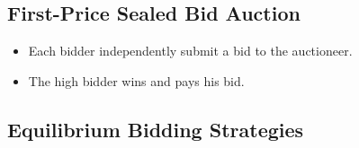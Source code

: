 \documentclass[]{book}
\providecommand{\tightlist}{%
  \setlength{\itemsep}{0pt}\setlength{\parskip}{0pt}}
\begin{document}
\subsection{First-Price Sealed Bid
Auction}\label{first-price-sealed-bid-auction}

\begin{itemize}
\tightlist
\item
  Each bidder independently submit a bid to the auctioneer.
\item
  The high bidder wins and pays his bid.
\end{itemize}

\subsection{Equilibrium Bidding
Strategies}\label{equilibrium-bidding-strategies-1}
\end{document}
